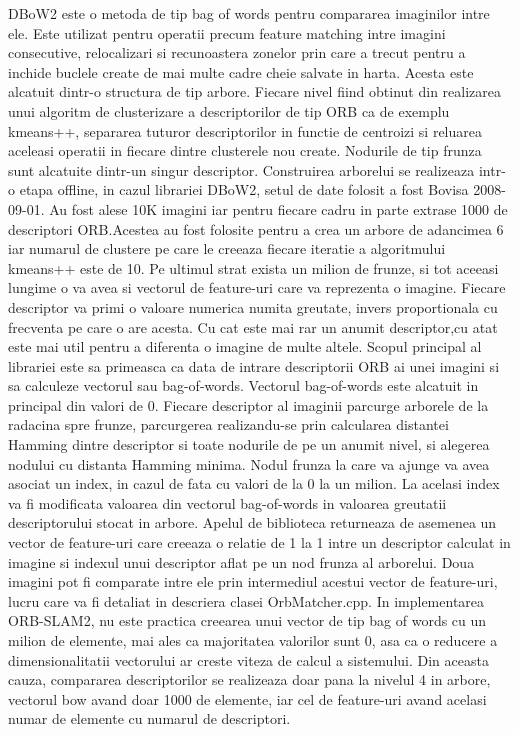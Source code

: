 \documentclass[12pt,a4paper]{report}
\begin{document}
DBoW2 este o metoda de tip bag of words pentru compararea imaginilor intre ele. Este utilizat
pentru operatii precum feature matching intre imagini consecutive, relocalizari si recunoastera
zonelor prin care a trecut pentru a inchide buclele create de mai multe cadre cheie salvate
in harta. Acesta este alcatuit dintr-o structura de tip arbore. Fiecare nivel fiind obtinut
din realizarea unui algoritm de clusterizare a descriptorilor de tip ORB ca de exemplu 
kmeans++, separarea tuturor descriptorilor in functie de centroizi si reluarea aceleasi
operatii in fiecare dintre clusterele nou create. Nodurile de tip frunza sunt alcatuite 
dintr-un singur descriptor. Construirea arborelui se realizeaza intr-o etapa offline, in cazul
librariei DBoW2, setul de date folosit a fost Bovisa 2008{-}09{-}01. Au fost alese 10K imagini
iar pentru fiecare cadru in parte extrase 1000 de descriptori ORB.\@ Acestea au fost folosite 
pentru a crea un arbore de adancimea 6 iar numarul de clustere pe care le creeaza fiecare 
iteratie a algoritmului kmeans++ este de 10. Pe ultimul strat exista un milion de frunze, si 
tot aceeasi lungime o va avea si vectorul de feature-uri care va reprezenta o imagine. Fiecare
descriptor va primi o valoare numerica numita greutate, invers proportionala cu frecventa pe 
care o are acesta. Cu cat este mai rar un anumit descriptor,cu atat este mai util pentru a 
diferenta o imagine de multe altele. Scopul principal al librariei este sa primeasca ca data
de intrare descriptorii ORB ai unei imagini si sa calculeze vectorul sau bag-of-words.
Vectorul bag-of-words este alcatuit in principal din valori de 0. Fiecare descriptor al 
imaginii parcurge arborele de la radacina spre frunze, parcurgerea realizandu-se prin 
calcularea distantei Hamming dintre descriptor si toate nodurile de pe un anumit nivel, 
si alegerea nodului cu distanta Hamming minima. Nodul frunza la care va ajunge va avea asociat
un index, in cazul de fata cu valori de la 0 la un milion. La acelasi index va fi modificata
valoarea din vectorul bag-of-words in valoarea greutatii descriptorului stocat in arbore.
Apelul de biblioteca returneaza de asemenea un vector de feature-uri care creeaza o relatie
de 1 la 1 intre un descriptor calculat in imagine si indexul unui descriptor aflat pe un 
nod frunza al arborelui. Doua imagini pot fi comparate intre ele prin intermediul acestui 
vector de feature-uri, lucru care va fi detaliat in descriera clasei OrbMatcher.cpp.  
In implementarea ORB-SLAM2, nu este practica creearea unui vector de tip bag of words 
cu un milion de elemente, mai ales ca majoritatea valorilor sunt 0, asa ca o reducere 
a dimensionalitatii vectorului ar creste viteza de calcul a sistemului. Din aceasta cauza,
compararea descriptorilor se realizeaza doar pana la nivelul 4 in arbore, vectorul bow avand 
doar 1000 de elemente, iar cel de feature-uri avand acelasi numar de elemente cu numarul de 
descriptori. 
\end{document}
